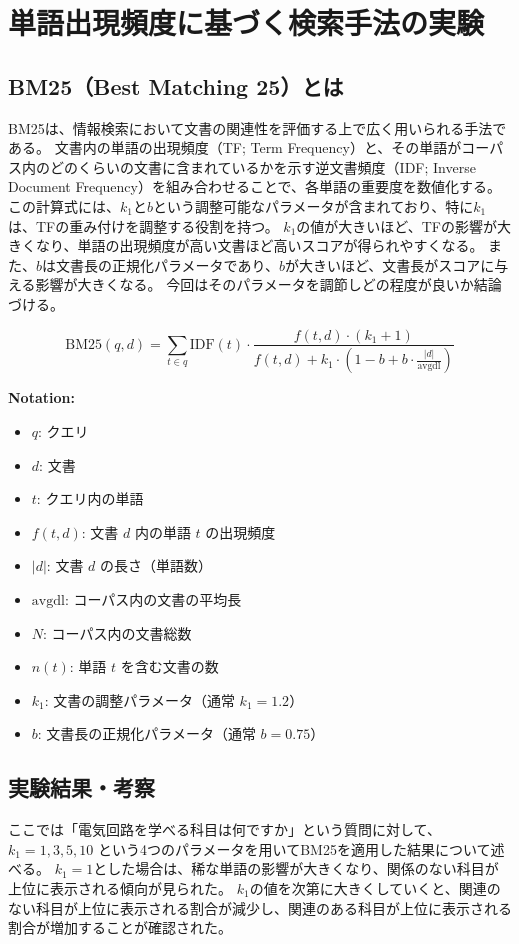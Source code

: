\section{単語出現頻度に基づく検索手法の実験}

\subsection{BM25（Best Matching 25）とは}
BM25\cite{isshiki2024bm25}は、情報検索において文書の関連性を評価する上で広く用いられる手法である。
文書内の単語の出現頻度（TF; Term Frequency）と、その単語がコーパス内のどのくらいの文書に含まれているかを示す逆文書頻度（IDF; Inverse Document Frequency）を組み合わせることで、各単語の重要度を数値化する。
この計算式には、$k_1$と$b$という調整可能なパラメータが含まれており、特に$k_1$は、TFの重み付けを調整する役割を持つ。
$k_1$の値が大きいほど、TFの影響が大きくなり、単語の出現頻度が高い文書ほど高いスコアが得られやすくなる。
また、$b$は文書長の正規化パラメータであり、$b$が大きいほど、文書長がスコアに与える影響が大きくなる。
今回はそのパラメータを調節しどの程度が良いか結論づける。

\begin{equation}
    \text{BM25}(q, d) = \sum_{t \in q} \text{IDF}(t) \cdot \frac{f(t, d) \cdot (k_1 + 1)}{f(t, d) + k_1 \cdot \left(1 - b + b \cdot \frac{|d|}{\text{avgdl}}\right)}
\end{equation}

\noindent
\textbf{Notation:}
\begin{itemize}
    \item $q$: クエリ
    \item $d$: 文書
    \item $t$: クエリ内の単語
    \item $f(t, d)$: 文書 $d$ 内の単語 $t$ の出現頻度
    \item $|d|$: 文書 $d$ の長さ（単語数）
    \item $\text{avgdl}$: コーパス内の文書の平均長
    \item $N$: コーパス内の文書総数
    \item $n(t)$: 単語 $t$ を含む文書の数
    \item $k_1$: 文書の調整パラメータ（通常 $k_1 = 1.2$）
    \item $b$: 文書長の正規化パラメータ（通常 $b = 0.75$）
\end{itemize}

\subsection{実験結果・考察}
ここでは「電気回路を学べる科目は何ですか」という質問に対して、$k_1 = 1, 3, 5, 10$ という4つのパラメータを用いてBM25を適用した結果について述べる。
$k_1 = 1$とした場合は、稀な単語の影響が大きくなり、関係のない科目が上位に表示される傾向が見られた。
$k_1$の値を次第に大きくしていくと、関連のない科目が上位に表示される割合が減少し、関連のある科目が上位に表示される割合が増加することが確認された。

